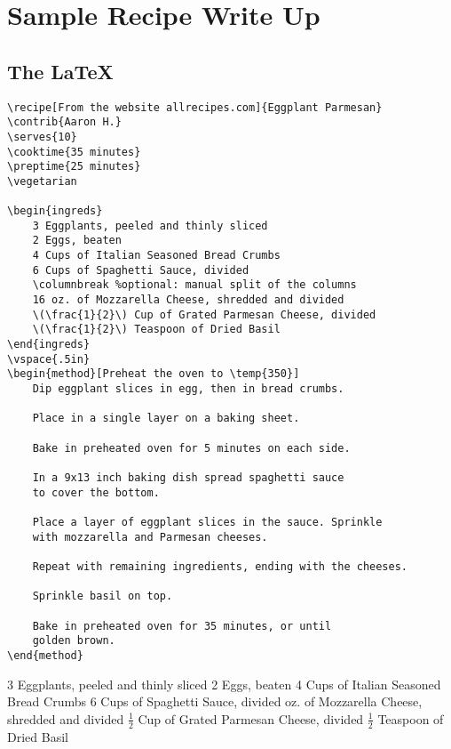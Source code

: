 \newpage
\section*{Sample Recipe Write Up }
\subsection*{The \LaTeX}
\begin{verbatim}
\recipe[From the website allrecipes.com]{Eggplant Parmesan}
\contrib{Aaron H.}
\serves{10}
\cooktime{35 minutes}
\preptime{25 minutes}
\vegetarian

\begin{ingreds}
    3 Eggplants, peeled and thinly sliced
    2 Eggs, beaten
    4 Cups of Italian Seasoned Bread Crumbs
    6 Cups of Spaghetti Sauce, divided
    \columnbreak %optional: manual split of the columns
    16 oz. of Mozzarella Cheese, shredded and divided
    \(\frac{1}{2}\) Cup of Grated Parmesan Cheese, divided
    \(\frac{1}{2}\) Teaspoon of Dried Basil
\end{ingreds}
\vspace{.5in}
\begin{method}[Preheat the oven to \temp{350}]
    Dip eggplant slices in egg, then in bread crumbs. 
    
    Place in a single layer on a baking sheet. 
    
    Bake in preheated oven for 5 minutes on each side.
    
    In a 9x13 inch baking dish spread spaghetti sauce 
    to cover the bottom. 
    
    Place a layer of eggplant slices in the sauce. Sprinkle 
    with mozzarella and Parmesan cheeses. 
    
    Repeat with remaining ingredients, ending with the cheeses. 
    
    Sprinkle basil on top.
    
    Bake in preheated oven for 35 minutes, or until 
    golden brown.
\end{method}
\end{verbatim}

\vegetarian

\begin{ingreds}
    3 Eggplants, peeled and thinly sliced
    2 Eggs, beaten
    4 Cups of Italian Seasoned Bread Crumbs
    6 Cups of Spaghetti Sauce, divided
     oz. of Mozzarella Cheese, shredded and divided
    \(\frac{1}{2}\) Cup of Grated Parmesan Cheese, divided
    \(\frac{1}{2}\) Teaspoon of Dried Basil
\end{ingreds}

